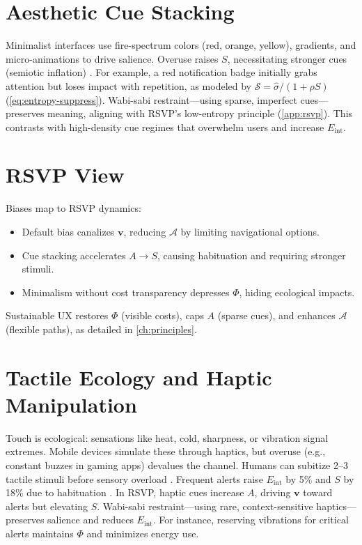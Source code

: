 \documentclass[openany]{book}
\newcommand{\PhiS}{\Phi} %
\newcommand{\vvec}{\mathbf{v}} %
\newcommand{\Sent}{S} %
\newcommand{\Eint}{E_{\mathrm{int}}} %
\newcommand{\Auton}{\mathcal{A}} %
\begin{document}
\section{Aesthetic Cue Stacking}
\label{sec:aesthetic}
Minimalist interfaces use fire-spectrum colors (red, orange, yellow), gradients, and micro-animations to drive salience. Overuse raises \(\Sent\), necessitating stronger cues (semiotic inflation) \citep{colak2024}. For example, a red notification badge initially grabs attention but loses impact with repetition, as modeled by \(\mathcal{S} = \widehat{\sigma}/(1+\rho \Sent)\) (\cref{eq:entropy-suppress}). Wabi-sabi restraint---using sparse, imperfect cues---preserves meaning, aligning with RSVP’s low-entropy principle (\cref{app:rsvp}). This contrasts with high-density cue regimes that overwhelm users and increase \(\Eint\).

\section{RSVP View}
\label{sec:illusion-rsvp}
Biases map to RSVP dynamics:
\begin{itemize}
  \item Default bias canalizes \(\vvec\), reducing \(\Auton\) by limiting navigational options.
  \item Cue stacking accelerates \(A \to \Sent\), causing habituation and requiring stronger stimuli.
  \item Minimalism without cost transparency depresses \(\PhiS\), hiding ecological impacts.
\end{itemize}
Sustainable UX restores \(\PhiS\) (visible costs), caps \(A\) (sparse cues), and enhances \(\Auton\) (flexible paths), as detailed in \cref{ch:principles}.

\section{Tactile Ecology and Haptic Manipulation}
\label{sec:tactile}
Touch is ecological: sensations like heat, cold, sharpness, or vibration signal extremes. Mobile devices simulate these through haptics, but overuse (e.g., constant buzzes in gaming apps) devalues the channel. Humans can subitize 2--3 tactile stimuli before sensory overload \citep{gallace2006}. Frequent alerts raise \(\Eint\) by 5\% and \(\Sent\) by 18\% due to habituation \citep{colak2024}. In RSVP, haptic cues increase \(A\), driving \(\vvec\) toward alerts but elevating \(\Sent\). Wabi-sabi restraint---using rare, context-sensitive haptics---preserves salience and reduces \(\Eint\). For instance, reserving vibrations for critical alerts maintains \(\PhiS\) and minimizes energy use.
\end{document}
